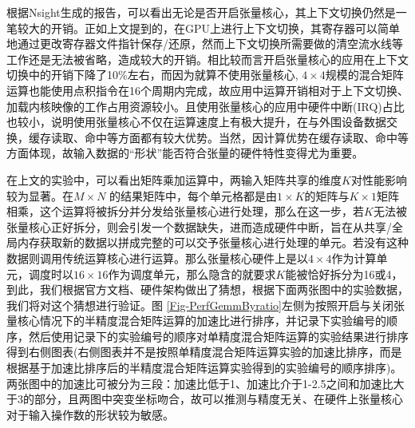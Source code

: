 \par 根据Nsight生成的报告，可以看出无论是否开启张量核心，其上下文切换仍然是一笔较大的开销。正如上文提到的，在GPU上进行上下文切换，其寄存器可以简单地通过更改寄存器文件指针保存/还原，然而上下文切换所需要做的清空流水线等工作还是无法被省略，造成较大的开销。相比较而言开启张量核心的应用在上下文切换中的开销下降了10\%左右，而因为就算不使用张量核心, $ 4\times4 $规模的混合矩阵运算也能使用点积指令在16个周期内完成，故应用中运算开销相对于上下文切换、加载内核映像的工作占用资源较小。且使用张量核心的应用中硬件中断(IRQ)占比也较小，说明使用张量核心不仅在运算速度上有极大提升，在与外围设备数据交换，缓存读取、命中等方面都有较大优势。当然，因计算优势在缓存读取、命中等方面体现，故输入数据的“形状”能否符合张量的硬件特性变得尤为重要。
\par 在上文的实验中，可以看出矩阵乘加运算中，两输入矩阵共享的维度$ K $对性能影响较为显著。在$ M\times N$ 的结果矩阵中，每个单元格都是由$ 1\times K $的矩阵与$ K\times 1 $矩阵相乘，这个运算将被拆分并分发给张量核心进行处理，那么在这一步，若$ K $无法被张量核心正好拆分，则会引发一个数据缺失，进而造成硬件中断，旨在从共享/全局内存获取新的数据以拼成完整的可以交予张量核心进行处理的单元。若没有这种数据则调用传统运算核心进行运算。那么张量核心硬件上是以$ 4\times 4 $作为计算单元，调度时以$ 16\times 16 $作为调度单元，那么隐含的就要求$ K $能被恰好拆分为16或4，到此，我们根据官方文档、硬件架构做出了猜想，根据下面两张图中的实验数据，我们将对这个猜想进行验证。图 \ref{Fig-PerfGemmByratio}左侧为按照开启与关闭张量核心情况下的半精度混合矩阵运算的加速比进行排序，并记录下实验编号的顺序，然后使用记录下的实验编号的顺序对单精度混合矩阵运算的实验结果进行排序得到右侧图表(右侧图表并不是按照单精度混合矩阵运算实验的加速比排序，而是根据基于加速比排序后的半精度混合矩阵运算实验得到的实验编号的顺序排序)。两张图中的加速比可被分为三段：加速比低于1、加速比介于1-2.5之间和加速比大于3的部分，且两图中突变坐标吻合，故可以推测与精度无关、在硬件上张量核心对于输入操作数的形状较为敏感。
